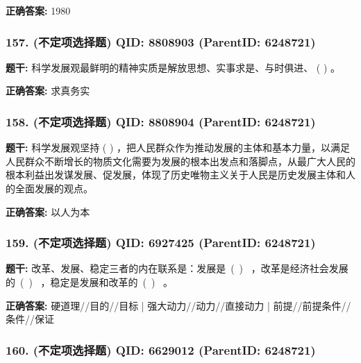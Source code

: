 \documentclass[12pt,UTF8]{ctexart}
\begin{document}
\textbf{正确答案:}
1980

\vspace{0.3em}\hrulefill\vspace{0.7em}

\subsubsection*{157. (不定项选择题) \small QID: 8808903 (ParentID: 6248721)}

\textbf{题干:}
科学发展观最鲜明的精神实质是解放思想、实事求是、与时俱进、 ( ) 。



\textbf{正确答案:}
求真务实

\vspace{0.3em}\hrulefill\vspace{0.7em}

\subsubsection*{158. (不定项选择题) \small QID: 8808904 (ParentID: 6248721)}

\textbf{题干:}
科学发展观坚持 ( ) ，把人民群众作为推动发展的主体和基本力量，以满足人民群众不断增长的物质文化需要为发展的根本出发点和落脚点，从最广大人民的根本利益出发谋发展、促发展，体现了历史唯物主义关于人民是历史发展主体和人的全面发展的观点。



\textbf{正确答案:}
以人为本

\vspace{0.3em}\hrulefill\vspace{0.7em}

\subsubsection*{159. (不定项选择题) \small QID: 6927425 (ParentID: 6248721)}

\textbf{题干:}
改革、发展、稳定三者的内在联系是：发展是 ( )    ，改革是经济社会发展的 ( )  ，稳定是发展和改革的 ( )    。



\textbf{正确答案:}
硬道理//目的//目标 | 强大动力//动力//直接动力 | 前提//前提条件//条件//保证

\vspace{0.3em}\hrulefill\vspace{0.7em}

\subsubsection*{160. (不定项选择题) \small QID: 6629012 (ParentID: 6248721)}
\end{document}

